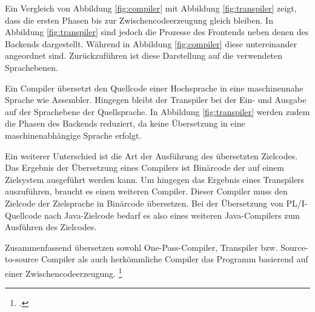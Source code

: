 Ein Vergleich von Abbildung \ref{fig:compiler} mit Abbildung \ref{fig:transpiler} zeigt, dass die ersten Phasen bis zur Zwischencodeerzeugung gleich bleiben. In Abbildung \ref{fig:transpiler} sind jedoch die Prozesse des Frontends neben denen des Backends dargestellt. Während in Abbildung \ref{fig:compiler} diese untereinander angeordnet sind. Zurückzuführen ist diese Darstellung auf die verwendeten Sprachebenen.

Ein Compiler übersetzt den Quellcode einer Hochsprache in eine maschinennahe Sprache wie Assembler. Hingegen bleibt der Transpiler bei der Ein- und Ausgabe auf der Sprachebene der Quellsprache. In Abbildung \ref{fig:transpiler} werden zudem die Phasen des Backends reduziert, da keine Übersetzung in eine maschinenabhängige Sprache erfolgt.

Ein weiterer Unterschied ist die Art der Ausführung des übersetzten Zielcodes.
Das Ergebnis der Übersetzung eines Compilers ist Binärcode der auf einem Zielsystem ausgeführt werden kann. Um hingegen das Ergebnis eines Transpilers auszuführen,
braucht es einen weiteren Compiler. Dieser Compiler muss den Zielcode der Zielsprache in Binärcode übersetzen.
Bei der Übersetzung von PL/I-Quellcode nach Java-Zielcode bedarf es also eines weiteren Java-Compilers zum Ausführen des Zielcodes.



Zusammenfassend übersetzen sowohl One-Pass-Compiler, Transpiler bzw. Source-to-source Compiler als auch herkömmliche Compiler das Programm basierend auf einer Zwischencodeerzeugung. \footcite[Vgl. ][S. 18ff. ]{assambly}

